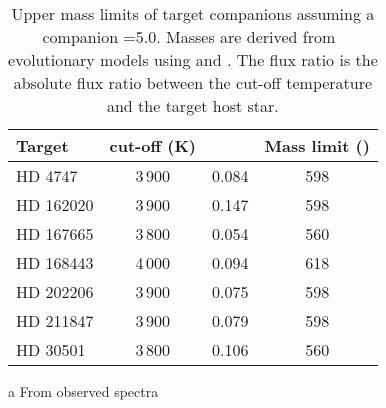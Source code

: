 \begin{table}
       \centering
  \begin{threeparttable}
       \caption[Upper mass limits from \textchisquared{} simulations.]{Upper mass limits of target companions assuming a companion \logg{}=5.0.
           Masses are derived from~\citet{baraffe_new_2015} evolutionary models using \Teff{} and \logg{}.
           The flux ratio \FtwoFone{} is the absolute flux ratio between the cut-off temperature and the target host star.}

        \begin{tabular}{l c c c}
            \toprule
            Target & \Teff{} cut-off (K) & \FtwoFone{} & Mass limit (\Mjup{})\\
            \midrule
            {HD 4747}     &  3\,900 & 0.084 & 598 \\
            {HD 162020} & 3\,900 & 0.147 & 598 \\
            {HD 167665} & 3\,800 & 0.054 & 560 \\
            {HD 168443} & 4\,000 & 0.094 & 618 \\
            {HD 202206} & 3\,900 & 0.075 & 598 \\
            {HD 211847} & 3\,900 & 0.079 & 598 \\
            {HD 30501}   & 3\,800\tnote{a} & 0.106 & 560 \\
            \bottomrule
        \end{tabular}
        \label{tab:mass_limits}
        \begin{tablenotes}[flushleft]
            \small
                \item [a] {From observed spectra }
        \end{tablenotes}
  \end{threeparttable}

\end{table}
